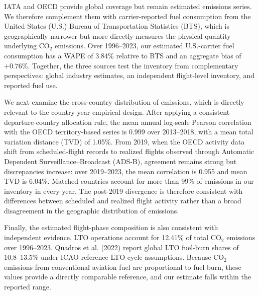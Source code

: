 \documentclass[12pt]{article}
\begin{document}
IATA and OECD provide global coverage but remain estimated emissions series. We therefore complement them with carrier-reported fuel consumption from the United States (U.S.) Bureau of Transportation Statistics (BTS), which is geographically narrower but more directly measures the physical quantity underlying CO$_2$ emissions. Over 1996--2023, our estimated U.S.-carrier fuel consumption has a WAPE of 3.84\% relative to BTS and an aggregate bias of $+0.76\%$. Together, the three sources test the inventory from complementary perspectives: global industry estimates, an independent flight-level inventory, and reported fuel use.

We next examine the cross-country distribution of emissions, which is directly relevant to the country-year empirical design. After applying a consistent departure-country allocation rule, the mean annual log-scale Pearson correlation with the OECD territory-based series is 0.999 over 2013--2018, with a mean total variation distance (TVD) of 1.05\%. From 2019, when the OECD activity data shift from scheduled-flight records to realized flights observed through Automatic Dependent Surveillance--Broadcast (ADS-B), agreement remains strong but discrepancies increase: over 2019--2023, the mean correlation is 0.955 and mean TVD is 6.04\%. Matched countries account for more than 99\% of emissions in our inventory in every year. The post-2019 divergence is therefore consistent with differences between scheduled and realized flight activity rather than a broad disagreement in the geographic distribution of emissions.

Finally, the estimated flight-phase composition is also consistent with independent evidence. LTO operations account for 12.41\% of total CO$_2$ emissions over 1996--2023. Quadros et al. (2022) report global LTO fuel-burn shares of 10.8--13.5\% under ICAO reference LTO-cycle assumptions. Because CO$_2$ emissions from conventional aviation fuel are proportional to fuel burn, these values provide a directly comparable reference, and our estimate falls within the reported range.
\end{document}
